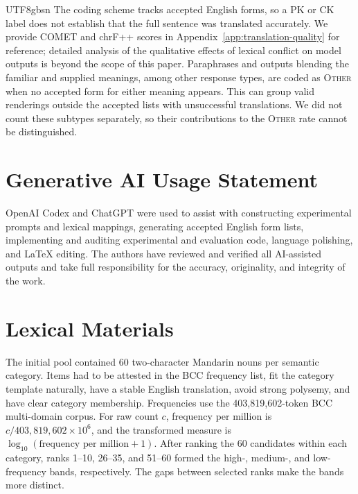 \documentclass[11pt]{article}
\begin{document}
\begin{CJK*}{UTF8}{gbsn}
The coding scheme tracks accepted English forms, so a \textsc{PK} or \textsc{CK} label does not establish that the full sentence was translated accurately. We provide COMET and chrF++ scores in Appendix~\ref{app:translation-quality} for reference; detailed analysis of the qualitative effects of lexical conflict on model outputs is beyond the scope of this paper. Paraphrases and outputs blending the familiar and supplied meanings, among other response types, are coded as \textsc{Other} when no accepted form for either meaning appears. This can group valid renderings outside the accepted lists with unsuccessful translations. We did not count these subtypes separately, so their contributions to the \textsc{Other} rate cannot be distinguished.

\section*{Generative AI Usage Statement}

OpenAI Codex and ChatGPT were used to assist with constructing experimental prompts and lexical mappings, generating accepted English form lists, implementing and auditing experimental and evaluation code, language polishing, and LaTeX editing. The authors have reviewed and verified all AI-assisted outputs and take full responsibility for the accuracy, originality, and integrity of the work.


%



\appendix
\section{Lexical Materials}
\label{app:lexical-materials}

The initial pool contained 60 two-character Mandarin nouns per semantic category. Items had to be attested in the BCC frequency list, fit the category template naturally, have a stable English translation, avoid strong polysemy, and have clear category membership. Frequencies use the 403,819,602-token BCC multi-domain corpus. For raw count $c$, frequency per million is $c/403{,}819{,}602 \times 10^6$, and the transformed measure is $\log_{10}(\text{frequency per million}+1)$. After ranking the 60 candidates within each category, ranks 1--10, 26--35, and 51--60 formed the high-, medium-, and low-frequency bands, respectively. The gaps between selected ranks make the bands more distinct.


\end{CJK*}
\end{document}
